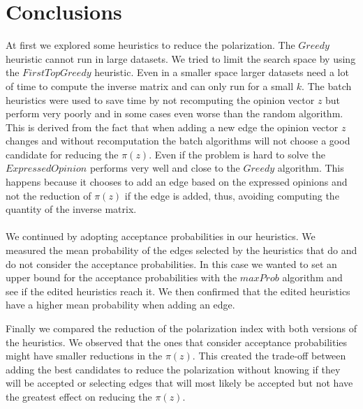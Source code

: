 \chapter{Conclusions}
\label{ch:conclusions}


At first we explored some heuristics to reduce the polarization. The $Greedy$ heuristic cannot run in large datasets. We tried to limit the search space by using the $FirstTopGreedy$ heuristic. Even in a smaller space larger datasets need a lot of time to compute the inverse matrix and can only run for a small $k$. The batch heuristics were used to save time by not recomputing the opinion vector $z$ but perform very poorly and in some cases even worse than the random algorithm. This is derived from the fact that when adding a new edge the opinion vector $z$ changes and without recomputation the batch algorithms will not choose a good candidate for reducing the $\pi(z)$. Even if the problem is hard to solve the $ExpressedOpinion$ performs very well and close to the $Greedy$ algorithm. This happens because it chooses to add an edge based on the expressed opinions and not the reduction of $\pi(z)$ if the edge is added, thus, avoiding computing the quantity of the inverse matrix.
\\
\\
We continued by adopting acceptance probabilities in our heuristics. We measured the mean probability of the edges selected by the heuristics that do and do not consider the acceptance probabilities. In this case we wanted to set an upper bound for the acceptance probabilities with the $maxProb$ algorithm and see if the edited heuristics reach it. We then confirmed that the edited heuristics have a higher mean probability when adding an edge. 

\clearpage

\noindent Finally we compared the reduction of the polarization index with both versions of the heuristics. We observed that the ones that consider acceptance probabilities might have smaller reductions in the $\pi(z)$. This created the trade-off between adding the best candidates to reduce the polarization without knowing if they will be accepted or selecting edges that will most likely be accepted but not have the greatest effect on reducing the $\pi(z)$.





